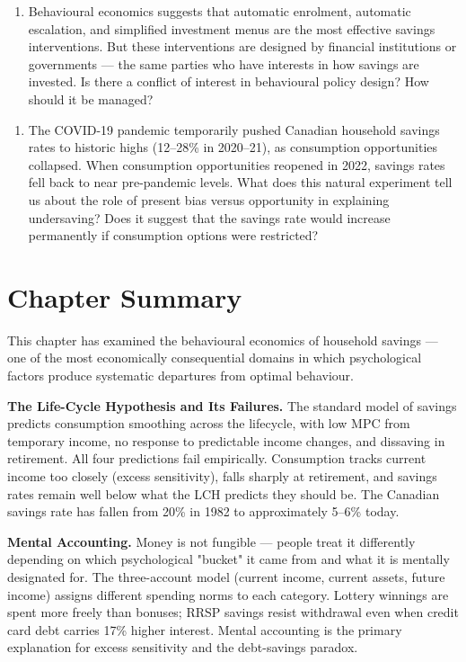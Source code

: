 \documentclass[12pt, letterpaper]{article}
\begin{document}
\begin{enumerate}
\item Behavioural economics suggests that automatic enrolment, automatic escalation, and simplified investment menus are the most effective savings interventions. But these interventions are designed by financial institutions or governments --- the same parties who have interests in how savings are invested. Is there a conflict of interest in behavioural policy design? How should it be managed?
\end{enumerate}

\begin{enumerate}
\item The COVID-19 pandemic temporarily pushed Canadian household savings rates to historic highs (12--28\% in 2020--21), as consumption opportunities collapsed. When consumption opportunities reopened in 2022, savings rates fell back to near pre-pandemic levels. What does this natural experiment tell us about the role of present bias versus opportunity in explaining undersaving? Does it suggest that the savings rate would increase permanently if consumption options were restricted?
\end{enumerate}

\medskip


\section*{Chapter Summary}


This chapter has examined the behavioural economics of household savings --- one of the most economically consequential domains in which psychological factors produce systematic departures from optimal behaviour.

\textbf{The Life-Cycle Hypothesis and Its Failures.} The standard model of savings predicts consumption smoothing across the lifecycle, with low MPC from temporary income, no response to predictable income changes, and dissaving in retirement. All four predictions fail empirically. Consumption tracks current income too closely (excess sensitivity), falls sharply at retirement, and savings rates remain well below what the LCH predicts they should be. The Canadian savings rate has fallen from 20\% in 1982 to approximately 5--6\% today.

\textbf{Mental Accounting.} Money is not fungible --- people treat it differently depending on which psychological "bucket" it came from and what it is mentally designated for. The three-account model (current income, current assets, future income) assigns different spending norms to each category. Lottery winnings are spent more freely than bonuses; RRSP savings resist withdrawal even when credit card debt carries 17\% higher interest. Mental accounting is the primary explanation for excess sensitivity and the debt-savings paradox.
\end{document}
